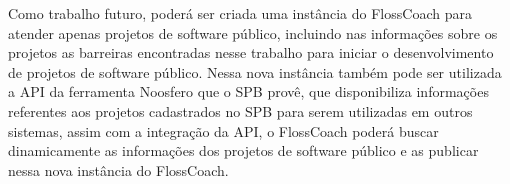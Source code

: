 Como trabalho futuro, poderá ser criada uma instância do FlossCoach para
atender apenas projetos de software público, incluindo nas informações sobre os projetos
as barreiras encontradas nesse trabalho para iniciar o desenvolvimento de 
projetos de software público. Nessa nova instância também pode ser utilizada a 
API da ferramenta Noosfero que o SPB provê, que disponibiliza informações referentes aos 
projetos cadastrados no SPB para serem utilizadas em outros sistemas, assim com
a integração da API, o FlossCoach poderá buscar dinamicamente as informações dos 
projetos de software público e as publicar nessa nova instância do FlossCoach.



